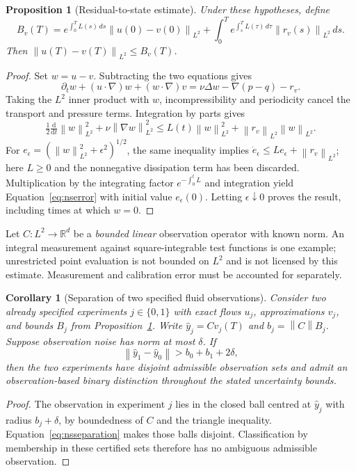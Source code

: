 \documentclass[11pt,a4paper]{article}
\newtheorem{proposition}[theorem]{Proposition}
\newtheorem{corollary}[theorem]{Corollary}
\theoremstyle{definition}
\theoremstyle{remark}
\newcommand{\R}{\mathbb{R}}
\newcommand{\norm}[1]{\left\lVert#1\right\rVert}
\begin{document}
\begin{proposition}[Residual-to-state estimate]\label{prop:nsresidual}
Under these hypotheses, define
\begin{equation}\label{eq:nserror}
 B_v(T)=e^{\int_0^T L(s)\,ds}\norm{u(0)-v(0)}_{L^2}
 +\int_0^T e^{\int_s^T L(\tau)\,d\tau}\norm{r_v(s)}_{L^2}\,ds.
\end{equation}
Then $\norm{u(T)-v(T)}_{L^2}\leq B_v(T)$.
\end{proposition}
\begin{proof}
Set $w=u-v$. Subtracting the two equations gives
\[
 \partial_t w+(u\cdot\nabla)w+(w\cdot\nabla)v
 =\nu\Delta w-\nabla(p-q)-r_v.
\]
Taking the $L^2$ inner product with $w$, incompressibility and periodicity cancel the transport and pressure terms. Integration by parts gives
\[
 \tfrac12\tfrac{\mathrm d}{\mathrm dt}\norm{w}_{L^2}^{2}
 +\nu\norm{\nabla w}_{L^2}^{2}
 \leq L(t)\norm{w}_{L^2}^{2}+\norm{r_v}_{L^2}\norm{w}_{L^2}.
\]
For $e_\epsilon=(\norm{w}_{L^2}^2+\epsilon^2)^{1/2}$, the same inequality implies
$\dot e_\epsilon\leq L e_\epsilon+\norm{r_v}_{L^2}$; here $L\geq0$ and the nonnegative dissipation term has been discarded. Multiplication by the integrating factor $e^{-\int_0^tL}$ and integration yield Equation~\eqref{eq:nserror} with initial value $e_\epsilon(0)$. Letting $\epsilon\downarrow0$ proves the result, including times at which $w=0$.
\end{proof}

Let $C:L^2\to\R^d$ be a \emph{bounded linear} observation operator with known norm. An integral measurement against square-integrable test functions is one example; unrestricted point evaluation is not bounded on $L^2$ and is not licensed by this estimate. Measurement and calibration error must be accounted for separately.

\begin{corollary}[Separation of two specified fluid observations]\label{cor:nsobservation}
Consider two already specified experiments $j\in\{0,1\}$ with exact flows $u_j$, approximations $v_j$, and bounds $B_j$ from Proposition~\ref{prop:nsresidual}. Write $\hat y_j=Cv_j(T)$ and $b_j=\norm{C}B_j$. Suppose observation noise has norm at most $\delta$. If
\begin{equation}\label{eq:nsseparation}
 \norm{\hat y_1-\hat y_0}>b_0+b_1+2\delta,
\end{equation}
then the two experiments have disjoint admissible observation sets and admit an observation-based binary distinction throughout the stated uncertainty bounds.
\end{corollary}
\begin{proof}
The observation in experiment $j$ lies in the closed ball centred at $\hat y_j$ with radius $b_j+\delta$, by boundedness of $C$ and the triangle inequality. Equation~\eqref{eq:nsseparation} makes those balls disjoint. Classification by membership in these certified sets therefore has no ambiguous admissible observation.
\end{proof}
\end{document}
